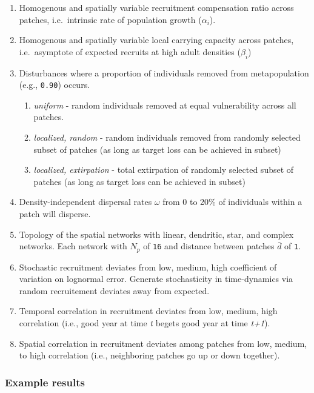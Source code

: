 \documentclass[]{article}
\providecommand{\tightlist}{%
  \setlength{\itemsep}{0pt}\setlength{\parskip}{0pt}}
\begin{document}
\begin{enumerate}
\def\labelenumi{\arabic{enumi}.}
\item
  Homogenous and spatially variable recruitment compensation ratio
  across patches, i.e.~intrinsic rate of population growth
  (\(\alpha_i\)).
\item
  Homogenous and spatially variable local carrying capacity across
  patches, i.e.~asymptote of expected recruits at high adult densities
  (\(\beta_i\))
\item
  Disturbances where a proportion of individuals removed from
  metapopulation (e.g., \texttt{0.90}) occurs.

  \begin{enumerate}
  \def\labelenumii{\alph{enumii}.}
  \tightlist
  \item
    \emph{uniform} - random individuals removed at equal vulnerability
    across all patches.
  \item
    \emph{localized, random} - random individuals removed from randomly
    selected subset of patches (as long as target loss can be achieved
    in subset)
  \item
    \emph{localized, extirpation} - total extirpation of randomly
    selected subset of patches (as long as target loss can be achieved
    in subset)
  \end{enumerate}
\item
  Density-independent dispersal rates \(\omega\) from 0 to 20\% of
  individuals within a patch will disperse.
\item
  Topology of the spatial networks with linear, dendritic, star, and
  complex networks. Each network with \(N_p\) of \texttt{16} and
  distance between patches \(\bar{d}\) of \texttt{1}.
\item
  Stochastic recruitment deviates from low, medium, high coefficient of
  variation on lognormal error. Generate stochasticity in time-dynamics
  via random recruitement deviates away from expected.
\item
  Temporal correlation in recruitment deviates from low, medium, high
  correlation (i.e., good year at time \emph{t} begets good year at time
  \emph{t+1}).
\item
  Spatial correlation in recruitment deviates among patches from low,
  medium, to high correlation (i.e., neighboring patches go up or down
  together).
\end{enumerate}

\hypertarget{example-results}{%
\subsubsection{Example results}\label{example-results}}
\end{document}
